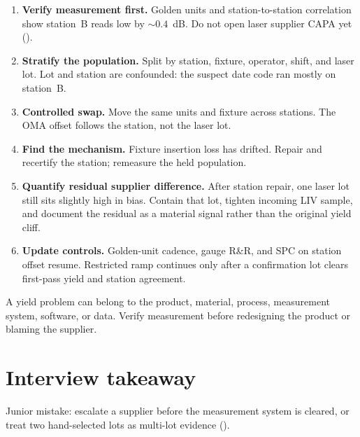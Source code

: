 \begin{enumerate}
\item \textbf{Verify measurement first.} Golden units and station-to-station
      correlation show station~B reads low by $\sim0.4$~dB. Do not open laser
      supplier CAPA yet ().
\item \textbf{Stratify the population.} Split by station, fixture, operator,
      shift, and laser lot. Lot and station are confounded: the suspect date code
      ran mostly on station~B.
\item \textbf{Controlled swap.} Move the same units and fixture across stations.
      The OMA offset follows the station, not the laser lot.
\item \textbf{Find the mechanism.} Fixture insertion loss has drifted. Repair and
      recertify the station; remeasure the held population.
\item \textbf{Quantify residual supplier difference.} After station repair, one
      laser lot still sits slightly high in bias. Contain that lot, tighten
      incoming LIV sample, and document the residual as a material signal rather
      than the original yield cliff.
\item \textbf{Update controls.} Golden-unit cadence, gauge R\&R, and SPC on
      station offset resume. Restricted ramp continues only after a confirmation
      lot clears first-pass yield and station agreement.
\end{enumerate}

A yield problem can belong to the product, material, process, measurement
system, software, or data. Verify measurement before redesigning the product or
blaming the supplier.

\section{Interview takeaway}
\label{sec:manufacturing-design-review}


Junior mistake: escalate a supplier before the measurement system is cleared, or
treat two hand-selected lots as multi-lot evidence
().


